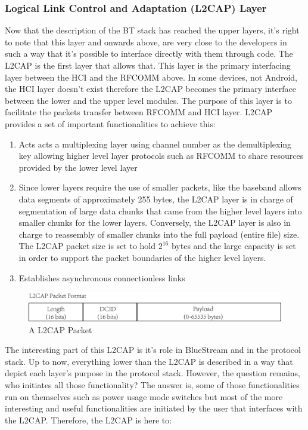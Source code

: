 \documentclass[a4paper,12pt]{article}
\begin{document}
\subsubsection{Logical Link Control and Adaptation (L2CAP) Layer}
Now that the description of the BT stack has reached the upper layers, it’s right to note that this layer and onwards above, are very close to the developers in such a way that it's possible to interface directly with them through code. The L2CAP is the first layer that allows that. This layer is the primary interfacing layer between the HCI and the RFCOMM above. In some devices, not Android, the HCI layer doesn’t exist therefore the L2CAP becomes the primary interface between the lower and the upper level modules. The purpose of this layer is to facilitate the packets transfer between RFCOMM and HCI layer. L2CAP provides a set of important functionalities to achieve this:

\begin{enumerate}
\item Acts acts a multiplexing layer using channel number as the demultiplexing key allowing higher level layer protocols such as RFCOMM to share resources provided by the lower level layer
\item Since lower layers require the use of smaller packets, like the baseband allows data segments of approximately 255 bytes, the L2CAP layer is in charge of segmentation of large data chunks that came from the higher level layers into smaller chunks for the lower layers. Conversely, the L2CAP layer is also in charge to reassembly of smaller chunks into the full payload (entire file) size. The L2CAP packet size is set to hold $2^{16}$ bytes and the large capacity is set in order to support the packet boundaries of the higher level layers.
\item Establishes asynchronous connectionless links
\end{enumerate}

\begin{figure}[h!]
\centering
\includegraphics[scale=.8]{Figures/Figure5.png}
\caption{A L2CAP Packet}
\label{fig:L2CAPPacket}
\end{figure}

The interesting part of this L2CAP is it’s role in BlueStream and in the protocol stack. Up to now, everything lower than the L2CAP is described in a way that depict each layer's purpose in the protocol stack. However, the question remains, who initiates all those functionality? The answer is, some of those functionalities run on themselves such as power usage mode switches but most of the more interesting and useful functionalities are initiated by the user that interfaces with the L2CAP. Therefore, the L2CAP is here to:
\end{document}
